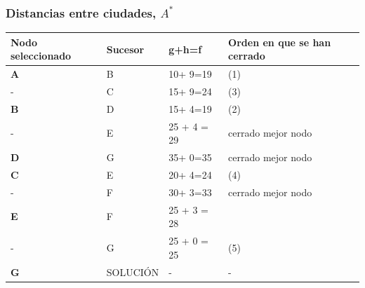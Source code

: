 \documentclass[xcolor=table]{beamer}
\begin{document}
 

\begin{frame} \frametitle{Distancias entre ciudades, $A^*$} \footnotesize

\begin{table}[]
\begin{tabular}{|l|l|l|l|}
\hline
\rowcolor[HTML]{C0C0C0} 
\textbf{Nodo seleccionado}  & \textbf{Sucesor}           & \textbf{g+h=f}               & \textbf{Orden en que se han cerrado} \\ \hline
\textbf{A}         & B            & 10+ 9=19         &    (1)     \\ \hline
-                  & C            & 15+ 9=24        &     (3)     \\ \hline\hline

\textbf{B}     & D           & 15+ 4=19   & (2)          \\ \hline
-              & E          & 25 + 4 = 29  &     cerrado mejor nodo \\ \hline\hline

\textbf{D}   & G             & 35+ 0=35                 &   cerrado mejor nodo   \\ \hline\hline

\textbf{C}     & E           & 20+ 4=24   & (4)          \\ \hline
-              & F          & 30+ 3=33  &      cerrado mejor nodo          \\ \hline\hline

\textbf{E}     & F           & 25 + 3 = 28   &           \\ \hline
-              & G          & 25 + 0 = 25  &   (5)             \\ \hline\hline

\textbf{G}   & SOLUCIÓN             & -             & -    \\ \hline

\end{tabular}
\end{table}

\end{frame} 

\end{document}
